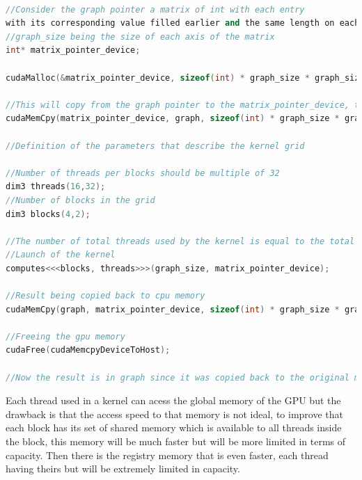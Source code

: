 \documentclass[runningheads]{llncs}
\begin{document}
\begin{lstlisting}[language=C++, caption=CUDA Example]

//Consider the graph pointer a matrix of int with each entry 
with its corresponding value filled earlier and the same length on each axis
//graph_size being the size of each axis of the matrix
int* matrix_pointer_device;

cudaMalloc(&matrix_pointer_device, sizeof(int) * graph_size * graph_size);

//This will copy from the graph pointer to the matrix_pointer_device, that is copying the matrix in the cpu memory to the pointer with memory allocated in the gpu memory
cudaMemCpy(matrix_pointer_device, graph, sizeof(int) * graph_size * graph_size, cudaMemcpyHostToDevice);

//Definition of the parameters that describe the kernel grid

//Number of threads per blocks should be multiple of 32
dim3 threads(16,32);
//Number of blocks in the grid
dim3 blocks(4,2); 

//The number of total threads used by the kernel is equal to the total number of threads per block multiplied by the number of blocks used by the kernel.
//Launch of the kernel
computes<<<blocks, threads>>>(graph_size, matrix_pointer_device);

//Result being copied back to cpu memory
cudaMemCpy(graph, matrix_pointer_device, sizeof(int) * graph_size * graph_size, cudaMemcpyDeviceToHost);

//Freeing the gpu memory
cudaFree(cudaMemcpyDeviceToHost);

//Now the result is in graph since it was copied back to the original matrix.

\end{lstlisting}






Each thread used in a kernel can acess the global memory of the GPU but the drawback is that the access speed to that memory is not ideal, to improve that each block has its set of shared memory which is available to all threads inside the block, this memory will be much faster but will be more limited in terms of capacity. Then there is the registry memory that is even faster, each thread having theirs but will be extremely limited in capacity.
\end{document}
